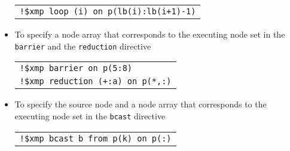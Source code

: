 \begin{itemize}

\begin{tabular}{l}
\verb|!$xmp loop (i) on p(lb(i):lb(i+1)-1)| \\
\end{tabular}%

\item To specify a node array that corresponds to the executing node set
      in the {\tt barrier} and the {\tt reduction} directive


\begin{tabular}{l}
\verb|!$xmp barrier on p(5:8)| \\
\verb|!$xmp reduction (+:a) on p(*,:)| \\
\end{tabular}

\item To specify the source node and a node array that corresponds to
      the executing node set in the {\tt bcast} directive 


\begin{tabular}{l}
\verb|!$xmp bcast b from p(k) on p(:)| \\
\end{tabular}
\end{itemize}

%


